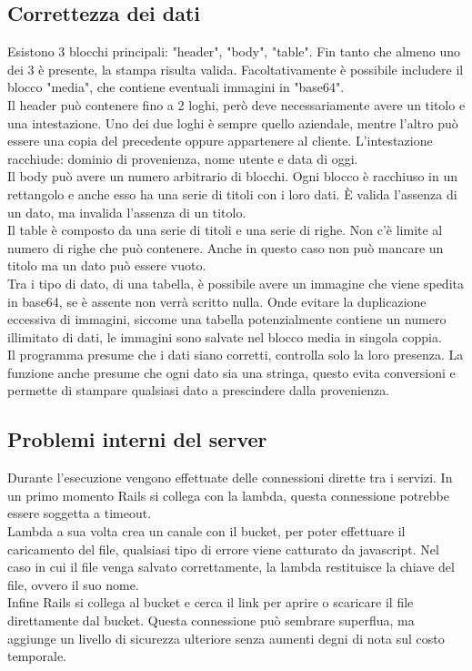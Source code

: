 \documentclass[12pt]{article}
\begin{document}
\subsection{Correttezza dei dati}
Esistono 3 blocchi principali: "header", "body", "table".
Fin tanto che almeno uno dei 3 è presente, la stampa risulta valida.
Facoltativamente è possibile includere il blocco "media", che contiene 
eventuali immagini in "base64". 
\\ Il header può contenere fino a 2 loghi, però deve necessariamente avere 
un titolo e una intestazione. 
Uno dei due loghi è sempre quello aziendale, mentre l'altro può essere una copia 
del precedente oppure appartenere al cliente.
L'intestazione racchiude: dominio di provenienza, nome utente e data di oggi.
\\ Il body può avere un numero arbitrario di blocchi. Ogni blocco è racchiuso 
in un rettangolo e anche esso ha una serie di titoli con i loro dati. 
È valida l'assenza di un dato, ma invalida l'assenza di un titolo. 
\\ Il table è composto da una serie di titoli e una serie di righe. Non c'è limite 
al numero di righe che può contenere.
Anche in questo caso non può mancare un titolo ma un dato può essere vuoto. 
\\ Tra i tipo di dato, di una tabella, 
è possibile avere un immagine che viene spedita in 
base64, se è assente non verrà scritto nulla. Onde evitare la duplicazione 
eccessiva di immagini, siccome una tabella potenzialmente contiene un numero 
illimitato di dati, le immagini sono salvate nel blocco media in singola coppia. 
\\ Il programma presume che i dati siano corretti, controlla solo la loro presenza.
La funzione anche presume che ogni dato sia una stringa, questo evita conversioni 
e permette di stampare qualsiasi dato a prescindere dalla provenienza.

\subsection{Problemi interni del server}
Durante l'esecuzione vengono effettuate delle connessioni dirette tra i servizi. 
In un primo momento Rails si collega con la lambda, questa connessione potrebbe 
essere soggetta a timeout. 
\\ Lambda a sua volta crea un canale con il bucket, per poter 
effettuare il caricamento del file, qualsiasi tipo di errore viene catturato da javascript.
Nel caso in cui il file venga salvato correttamente,
la lambda restituisce la chiave del file, ovvero il suo nome. 
\\ Infine Rails si collega al bucket e cerca il link per aprire o scaricare il file 
direttamente dal bucket.
Questa connessione può sembrare superflua, ma aggiunge 
un livello di sicurezza ulteriore senza aumenti degni di nota sul costo temporale. 
\end{document}
